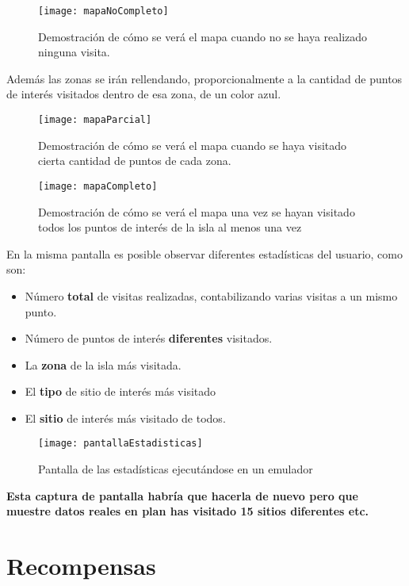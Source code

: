 \documentclass{report}
\begin{document}
\begin{figure}[H]
    \centering
    \texttt{[image: mapaNoCompleto]}
    \caption{Demostración de cómo se verá el mapa cuando no se haya realizado ninguna visita.}
    \label{fig:mapaNoCompleto}
\end{figure}

Además las zonas se irán rellendando, proporcionalmente a la cantidad de puntos de interés visitados dentro de esa zona, de un color azul.\\
\begin{figure}[H]
    \centering
    \texttt{[image: mapaParcial]}
    \caption{Demostración de cómo se verá el mapa cuando se haya visitado cierta cantidad de puntos de cada zona.}
    \label{fig:mapaParcial}
\end{figure}

\begin{figure}[H]
    \centering
    \texttt{[image: mapaCompleto]}
    \caption{Demostración de cómo se verá el mapa una vez se hayan visitado todos los puntos de interés de la isla al menos una vez}
    \label{fig:mapaCompleto}
\end{figure}

En la misma pantalla es posible observar diferentes estadísticas del usuario, como son:
\begin{itemize}
\item Número \textbf{total} de visitas realizadas, contabilizando varias visitas a un mismo punto.
\item Número de puntos de interés \textbf{diferentes} visitados.
\item La \textbf{zona} de la isla más visitada.
\item El \textbf{tipo} de sitio de interés más visitado
\item El \textbf{sitio} de interés más visitado de todos.
\end{itemize}

\begin{figure}[H]
    \centering
    \texttt{[image: pantallaEstadisticas]}
    \caption{Pantalla de las estadísticas ejecutándose en un emulador}
    \label{fig:pantallaEstadísticas}
\end{figure}
\textbf{Esta captura de pantalla habría que hacerla de nuevo pero que muestre datos reales en plan has visitado 15 sitios diferentes etc.}

\newpage
\section{Recompensas}
\end{document}
